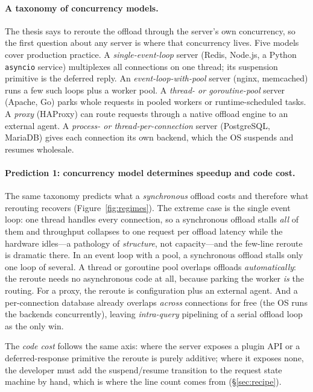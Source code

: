\paragraph{A taxonomy of concurrency models.}
The thesis says to reroute the offload through the server's own concurrency, so the first question
about any server is where that concurrency lives. Five models cover production practice. A
\emph{single-event-loop} server (Redis, Node.js, a Python \texttt{asyncio} service) multiplexes all
connections on one thread; its suspension primitive is the deferred reply. An
\emph{event-loop-with-pool} server (nginx, memcached) runs a few such loops plus a worker pool. A
\emph{thread- or goroutine-pool} server (Apache, Go) parks whole requests in pooled workers or
runtime-scheduled tasks. A \emph{proxy} (HAProxy) can route requests through a native offload
engine to an external agent. A \emph{process- or thread-per-connection} server (PostgreSQL,
MariaDB) gives each connection its own backend, which the OS suspends and resumes wholesale.

\paragraph{Prediction 1: concurrency model determines speedup and code cost.}
The same taxonomy predicts what a \emph{synchronous} offload costs and therefore what rerouting
recovers (Figure~\ref{fig:regimes}). The extreme case is the single event loop: one thread handles
every connection, so a synchronous offload stalls \emph{all} of them and throughput collapses to
one request per offload latency while the hardware idles---a pathology of \emph{structure}, not
capacity---and the few-line reroute is dramatic there. In an event loop with a pool, a synchronous
offload stalls only one loop of several. A thread or goroutine pool overlaps offloads
\emph{automatically}: the reroute needs no asynchronous code at all, because parking the worker
\emph{is} the routing. For a proxy, the reroute is configuration plus an external agent. And a
per-connection database already overlaps \emph{across} connections for free (the OS runs the
backends concurrently), leaving \emph{intra-query} pipelining of a serial offload loop as the only
win.

The \emph{code cost} follows the same axis: where the server exposes a plugin API or a
deferred-response primitive the reroute is purely additive; where it exposes none, the
developer must add the suspend/resume transition to the request state machine by hand, which is
where the line count comes from (\S\ref{sec:recipe}).

